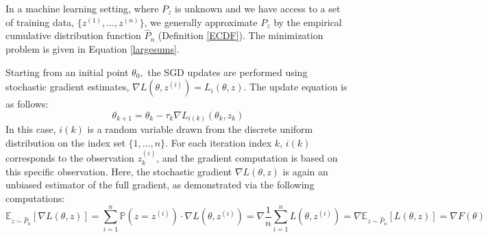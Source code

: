 \begin{comment}
Starting from an initial point $\theta_0$, the SGD updates are performed using the stochastic gradient estimate, computed based on the specific draw $z_k$ for each iteration index $k$. The update equation is as follows:
\begin{equation*}\tag{4.4.2}
\theta_{k+1} = \theta_k - \tau_k \nabla L(\theta_k, z_k)
\end{equation*}
In this equation, $\theta_k$ is the current parameter estimate, $\tau_k$ is the step size at iteration $k$, and $\nabla L(\theta_k, z_k)$ is the stochastic gradient estimate based on the draw $z_k$ from the distribution $P_z$.  
\end{comment}
In a machine learning setting, where $P_z$ is unknown and we have access to a set of training data, $\{z^{(1)},\ldots,z^{(n)}\}$, we generally approximate $P_z$ by the empirical cumulative distribution function $\hat{P}_{n}$ (Definition \ref{ECDF}). The minimization problem is given in Equation \eqref{largesums}.
\begin{comment}
\begin{equation*}\tag{4.4.4}
\underset{\theta\in\mathbb{R}^{p}}{\min}F(\theta) = \frac{1}{n}\sum_{i=1}^{n}L(\theta,z^{(i)}) = \frac{1}{n}\sum_{i=1}^{n}L_{i}(\theta,z)    
\end{equation*}
\end{comment}
Starting from an initial point $\theta_{0},$ the SGD updates are performed using stochastic gradient estimates, $\nabla L(\theta,z^{(i)})=L_{i}(\theta,z)$. The update equation is as follows: 
\begin{equation*}\label{SGD_update}\tag{5.4.3}
\theta_{k+1} = \theta_k - \tau_k \nabla L_{i(k)}(\theta_k,z_{k})
\end{equation*}
In this case, $i(k)$ is a random variable drawn from the discrete uniform distribution on the index set $\{1, \ldots, n\}$. For each iteration index $k$, $i(k)$ corresponds to the observation $z_{k}^{(i)}$, and the gradient computation is based on this specific observation. Here, the stochastic gradient $\nabla L(\theta, z)$ is again an unbiased estimator of the full gradient, as demonstrated via the following computations: 
\begin{equation*}\tag{5.4.4}
\mathbb{E}_{z \sim \hat{P}_{n}}[\nabla L(\theta, z)] = \sum_{i=1}^{n}\mathbb{P}(z = z^{(i)})\cdot \nabla L(\theta, z^{(i)}) =  \nabla\frac{1}{n}\sum_{i=1}^{n}L(\theta, z^{(i)}) = \nabla\mathbb{E}_{z \sim \hat{P}_{n}}[L(\theta, z)] = \nabla F(\theta)
\end{equation*}
